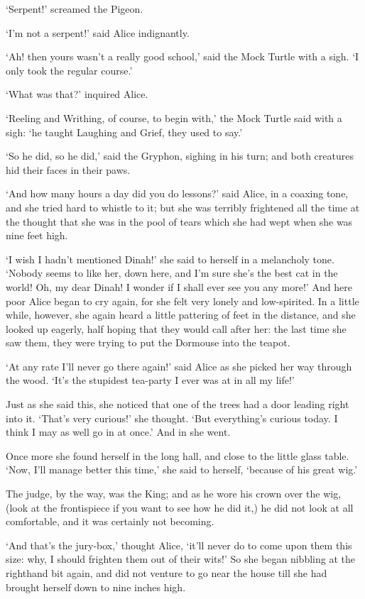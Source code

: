 \documentclass[statementpaper,twoside,openany]{memoir}
\begin{document}
`Serpent!' screamed the Pigeon.

`I'm not a serpent!' said Alice indignantly.

`Ah! then yours wasn't a really good school,' said the Mock Turtle with a sigh. `I only took the regular course.'

`What was that?' inquired Alice.

`Reeling and Writhing, of course, to begin with,' the Mock Turtle said with a sigh: `he taught Laughing and Grief, they used to say.'

`So he did, so he did,' said the Gryphon, sighing in his turn; and both creatures hid their faces in their paws.

`And how many hours a day did you do lessons?' said Alice, in a coaxing tone, and she tried hard to whistle to it; but she was terribly frightened all the time at the thought that she was in the pool of tears which she had wept when she was nine feet high.

`I wish I hadn't mentioned Dinah!' she said to herself in a melancholy tone. `Nobody seems to like her, down here, and I'm sure she's the best cat in the world! Oh, my dear Dinah! I wonder if I shall ever see you any more!' And here poor Alice began to cry again, for she felt very lonely and low-spirited. In a little while, however, she again heard a little pattering of feet in the distance, and she looked up eagerly, half hoping that they would call after her: the last time she saw them, they were trying to put the Dormouse into the teapot.

`At any rate I'll never go there again!' said Alice as she picked her way through the wood. `It's the stupidest tea-party I ever was at in all my life!'

Just as she said this, she noticed that one of the trees had a door leading right into it. `That's very curious!' she thought. `But everything's curious today. I think I may as well go in at once.' And in she went.

Once more she found herself in the long hall, and close to the little glass table. `Now, I'll manage better this time,' she said to herself, `because of his great wig.'

The judge, by the way, was the King; and as he wore his crown over the wig, (look at the frontispiece if you want to see how he did it,) he did not look at all comfortable, and it was certainly not becoming.

`And that's the jury-box,' thought Alice, `it'll never do to come upon them this size: why, I should frighten them out of their wits!' So she began nibbling at the righthand bit again, and did not venture to go near the house till she had brought herself down to nine inches high.
\end{document}
